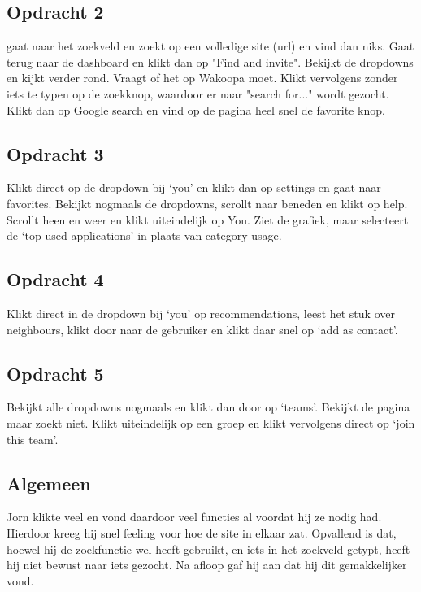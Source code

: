 \subsection{Opdracht 2}
gaat naar het zoekveld en zoekt op een volledige site (url) en vind dan niks. Gaat terug naar de dashboard en klikt dan op "Find and invite". Bekijkt de dropdowns en kijkt verder rond. Vraagt of het op Wakoopa moet. Klikt vervolgens zonder iets te typen op de zoekknop, waardoor er naar "search for..." wordt gezocht. Klikt dan op Google search en vind op de pagina heel snel de favorite knop.

\subsection{Opdracht 3}
Klikt direct op de dropdown bij `you' en klikt dan op settings en gaat naar favorites. Bekijkt nogmaals de dropdowns, scrollt naar beneden en klikt op help. Scrollt heen en weer en klikt uiteindelijk op You. Ziet de grafiek, maar selecteert de `top used applications' in plaats van category usage.

\subsection{Opdracht 4}
Klikt direct in de dropdown bij `you' op recommendations, leest het stuk over neighbours, klikt door naar de gebruiker en klikt daar snel op `add as contact'.

\subsection{Opdracht 5}
Bekijkt alle dropdowns nogmaals en klikt dan door op `teams'. Bekijkt de pagina maar zoekt niet. Klikt uiteindelijk op een groep en klikt vervolgens direct op `join this team'.

\subsection{Algemeen}
Jorn klikte veel en vond daardoor veel functies al voordat hij ze nodig had. Hierdoor kreeg hij snel feeling voor hoe de site in elkaar zat. Opvallend is dat, hoewel hij de zoekfunctie wel heeft gebruikt, en iets in het zoekveld getypt, heeft hij niet bewust naar iets gezocht. Na afloop gaf hij aan dat hij dit gemakkelijker vond.


